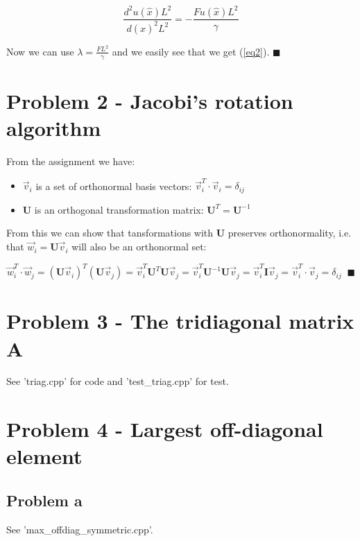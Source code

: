 \documentclass[english,notitlepage]{revtex4-1}  %
\begin{document}
\begin{equation*}
    \frac{d^2u(\hat{x})L^2}{d(\hat{x})^2L^2} = - \frac{Fu(\hat{x})L^2}{\gamma}
\end{equation*}

Now we can use $\lambda = \frac{FL^2}{\gamma}$ and we easily see that we get (\ref{eq2}). $\blacksquare$


\section*{Problem 2 - Jacobi’s rotation algorithm}

From the assignment we have:

\begin{itemize}
    \item $\vec{v}_i$ is a set of orthonormal basis vectors: $\vec{v}_i^T \cdot \vec{v}_i = \delta_{ij}$
    \item $\mathbf{U}$ is an orthogonal transformation matrix: $\mathbf{U}^T = \mathbf{U}^{-1}$
\end{itemize}

From this we can show that tansformations with $\mathbf{U}$ preserves orthonormality, i.e. that $\vec{w}_i = \mathbf{U} \vec{v}_i$ will also be an orthonormal set:

\begin{equation*}
    \vec{w}_i^T \cdot \vec{w}_j = (\mathbf{U}\vec{v}_i)^T (\mathbf{U} \vec{v}_j) = \vec{v}_i^T \mathbf{U}^T \mathbf{U} \vec{v}_j = \vec{v}_i^T \mathbf{U}^{-1} \mathbf{U} \vec{v}_j 
    = \vec{v}_i^T  \mathbf{I} \vec{v}_j = \vec{v}_i^T  \cdot \vec{v}_j = \delta_{ij} \;\; \blacksquare
\end{equation*}


\section*{Problem 3 - The tridiagonal matrix $\mathbf{A}$}
See 'triag.cpp' for code and 'test\_triag.cpp' for test. 

\section*{Problem 4 - Largest off-diagonal element}

\subsection*{Problem a}
See 'max\_offdiag\_symmetric.cpp'.
\end{document}
